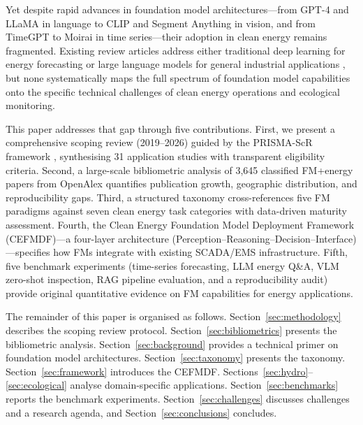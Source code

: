 \documentclass[preprint,12pt]{elsarticle}
\begin{document}
Yet despite rapid advances in foundation model architectures---from GPT-4 \cite{achiam2023gpt4} and LLaMA \cite{touvron2023llama2} in language to CLIP \cite{radford2021learning} and Segment Anything \cite{kirillov2023sam} in vision, and from TimeGPT to Moirai \cite{woo2024moirai} in time series---their adoption in clean energy remains fragmented. Existing review articles address either traditional deep learning for energy forecasting \cite{wang2019dl_renewable_forecasting, ahmed2020wind_forecasting_review} or large language models for general industrial applications \cite{zhao2023llm_survey, minaee2024llm_survey}, but none systematically maps the full spectrum of foundation model capabilities onto the specific technical challenges of clean energy operations and ecological monitoring.

This paper addresses that gap through five contributions. First, we present a comprehensive scoping review (2019--2026) guided by the PRISMA-ScR framework \cite{tricco2018prisma_scr, page2021prisma}, synthesising 31 application studies with transparent eligibility criteria. Second, a large-scale bibliometric analysis of 3{,}645 classified FM+energy papers from OpenAlex quantifies publication growth, geographic distribution, and reproducibility gaps. Third, a structured taxonomy cross-references five FM paradigms against seven clean energy task categories with data-driven maturity assessment. Fourth, the Clean Energy Foundation Model Deployment Framework (CEFMDF)---a four-layer architecture (Perception--Reasoning--Decision--Interface)---specifies how FMs integrate with existing SCADA/EMS infrastructure. Fifth, five benchmark experiments (time-series forecasting, LLM energy Q\&A, VLM zero-shot inspection, RAG pipeline evaluation, and a reproducibility audit) provide original quantitative evidence on FM capabilities for energy applications.

The remainder of this paper is organised as follows. Section~\ref{sec:methodology} describes the scoping review protocol. Section~\ref{sec:bibliometrics} presents the bibliometric analysis. Section~\ref{sec:background} provides a technical primer on foundation model architectures. Section~\ref{sec:taxonomy} presents the taxonomy. Section~\ref{sec:framework} introduces the CEFMDF. Sections~\ref{sec:hydro}--\ref{sec:ecological} analyse domain-specific applications. Section~\ref{sec:benchmarks} reports the benchmark experiments. Section~\ref{sec:challenges} discusses challenges and a research agenda, and Section~\ref{sec:conclusions} concludes.
\end{document}
